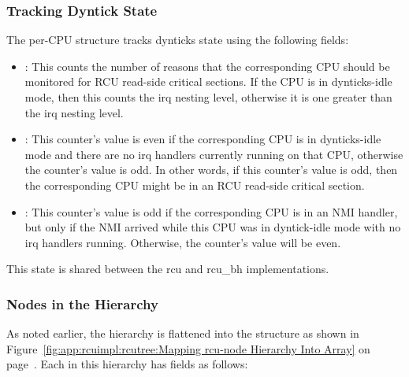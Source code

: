 \subsubsection{Tracking Dyntick State}
\label{app:rcuimpl:rcutreewt:Tracking Dyntick State}

The per-CPU  structure tracks dynticks state using the
following fields:

\begin{itemize}
\item	{}:
	This  counts the number of reasons that the corresponding
	CPU should be monitored for RCU read-side critical sections.
	If the CPU is in dynticks-idle mode, then this counts the
	irq nesting level, otherwise it is one greater than the
	irq nesting level.
\item	{}:
	This  counter's value is even if the corresponding CPU is
	in dynticks-idle mode and there are no irq handlers currently
	running on that CPU, otherwise the counter's value is odd.
	In other words, if this counter's value is odd, then the
	corresponding CPU might be in an RCU read-side critical section.
\item	{}:
	This  counter's value is odd if the corresponding CPU is
	in an NMI handler, but only if the NMI arrived while this
	CPU was in dyntick-idle mode with no irq handlers running.
	Otherwise, the counter's value will be even.
\end{itemize}

This state is shared between the rcu and rcu\_bh implementations.

\subsubsection{Nodes in the Hierarchy}
\label{app:rcuimpl:rcutreewt:Nodes in the Hierarchy}

As noted earlier, the  hierarchy is flattened into
the  structure as shown in
Figure~\ref{fig:app:rcuimpl:rcutree:Mapping rcu-node Hierarchy Into Array}
on
page~\pageref{fig:app:rcuimpl:rcutree:Mapping rcu-node Hierarchy Into Array}.
Each  in this hierarchy has fields as follows:

